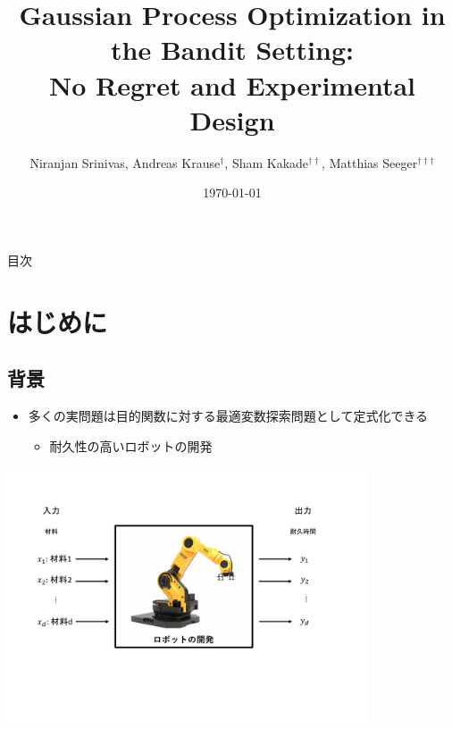 \documentclass[dvipdfmx, 10.5pt]{beamer}
\title[]{Gaussian Process Optimization in the Bandit Setting:\\No Regret and Experimental Design}
\subtitle{}
\author[]{Niranjan Srinivas, Andreas Krause$^{\dag}$, Sham Kakade$^{\dag\dag}$, Matthias Seeger$^{\dag\dag\dag}$}
\date[\today]{\today}
\institute[]{$\dag$: California Institute of Technology\\
$\dag\dag$: University of Pennsylvania\\
$\dag\dag\dag$: Saarland University}
\begin{document}

\begin{frame}
\maketitle%
\thispagestyle{empty}%
\end{frame}



\begin{frame}[noframenumbering]{目次}
	\tableofcontents[hideallsubsections]
	\thispagestyle{empty} %
\end{frame}

\section{はじめに}

\subsection{背景}
\begin{frame}{\insertsubsection}
	\begin{itemize}
		\item 多くの実問題は目的関数に対する最適変数探索問題として定式化できる
		\begin{itemize}
			\item 耐久性の高いロボットの開発
		\end{itemize}
	\end{itemize}
	\vspace{10pt}
	\begin{center}
		\includegraphics[width=0.80\textwidth]{./Fig/Robot.pdf}
	\end{center}
\end{frame}
\end{document}
